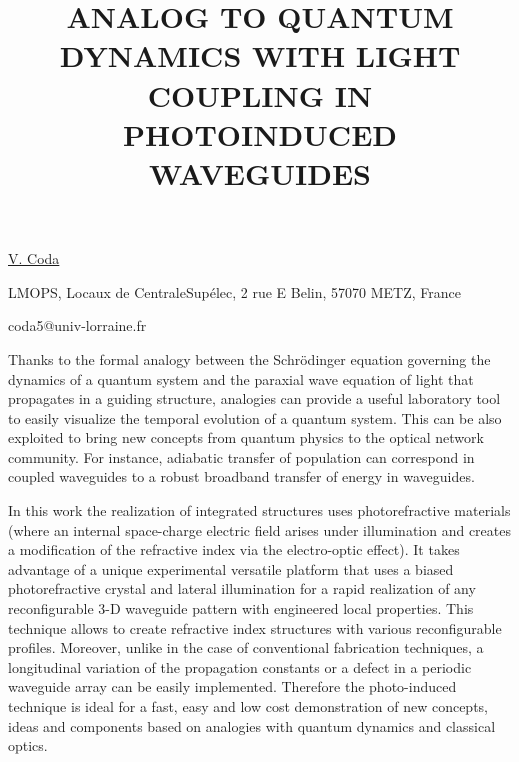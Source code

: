 \title{ANALOG TO QUANTUM DYNAMICS WITH LIGHT COUPLING IN PHOTOINDUCED WAVEGUIDES}

\underline{V. Coda} 

{\normalsize{\vspace{-4mm}
LMOPS,
Locaux de CentraleSup\'{e}lec,
2 rue E Belin,
57070 METZ,
France

\email coda5@univ-lorraine.fr}}

Thanks to the formal analogy between the Schr\"{o}dinger equation governing the dynamics of a quantum system and the
paraxial wave equation of light that propagates in a guiding structure, analogies can provide a useful laboratory tool to
easily visualize the temporal evolution of a quantum system. This can be also exploited to bring new concepts from
quantum physics to the optical network community.  For instance, adiabatic transfer of population can correspond in
coupled waveguides to a robust broadband transfer of energy in waveguides.

In this work the realization of integrated structures uses photorefractive materials (where an internal space-charge electric
field arises under illumination and creates a modification of the refractive index via the electro-optic effect). It takes
advantage of a unique experimental versatile platform that uses a biased photorefractive crystal and lateral illumination for
a rapid realization of any reconfigurable 3-D waveguide pattern with engineered local properties. This technique allows to
create refractive index structures with various reconfigurable profiles. Moreover, unlike in the case of conventional
fabrication techniques, a longitudinal variation of the propagation constants or a defect in a periodic waveguide array can
be easily implemented. Therefore the photo-induced technique is ideal for a fast, easy and low cost demonstration of new
concepts, ideas and components based on analogies with quantum dynamics and classical optics.

\vspace{\baselineskip}
